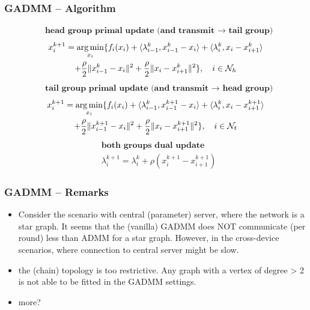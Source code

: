 \begin{frame}
\frametitle{GADMM -- Algorithm}

\begin{fleqn}
\begin{align*}
& \textbf{head group primal update (and transmit $\to$ tail group)}
\end{align*}
\begin{multline*}
    x_i^{k+1} = \operatorname*{arg\,min}\limits_{x_i} \{ f_i(x_i) + \langle \lambda_{i-1}^k, x_{i-1}^k - x_i \rangle + \langle \lambda_{i}^k, x_{i} - x_{i+1}^k \rangle \\
    + \dfrac{\rho}{2}\lVert x_{i-1}^k - x_i \rVert^2 + \dfrac{\rho}{2}\lVert x_{i} - x_{i+1}^k \rVert^2 \}, \quad i \in \mathcal{N}_h
\end{multline*}
\begin{align*}
& \textbf{tail group primal update (and transmit $\to$ head group)}
\end{align*}
\begin{multline*}
    x_i^{k+1} = \operatorname*{arg\,min}\limits_{x_i} \{ f_i(x_i) + \langle \lambda_{i-1}^k, x_{i-1}^{k+1} - x_i \rangle + \langle \lambda_{i}^k, x_{i} - x_{i+1}^{k+1} \rangle \\
    + \dfrac{\rho}{2}\lVert x_{i-1}^{k+1} - x_i \rVert^2 + \dfrac{\rho}{2}\lVert x_{i} - x_{i+1}^{k+1} \rVert^2 \}, \quad i \in \mathcal{N}_t
\end{multline*}
\begin{align*}
& \textbf{both groups dual update} \\
& \lambda_i^{k+1} = \lambda_i^k + \rho (x_i^{k+1} - x_{i+1}^{k+1})
\end{align*}
\end{fleqn}

\end{frame}


\begin{frame}
\frametitle{GADMM -- Remarks}

\begin{itemize}
    \item Consider the scenario with central (parameter) server, where the network is a star graph. It seems that the (vanilla) GADMM does {\color{red} NOT} communicate (per round) less than ADMM for a star graph. However, in the cross-device scenarios, where connection to central server might be slow.
    \item the (chain) topology is too restrictive. Any graph with a vertex of degree > 2 is not able to be fitted in the GADMM settings.
    \item more?
\end{itemize}

\end{frame}

